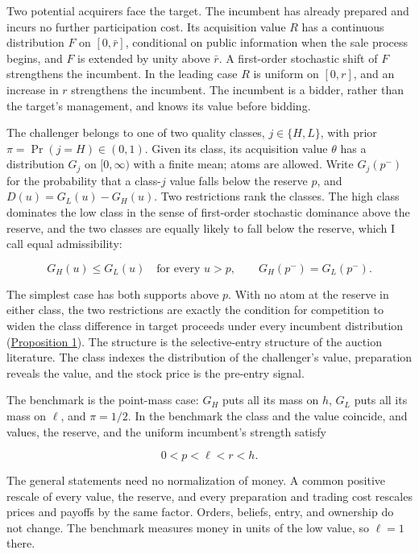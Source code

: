 Two potential acquirers face the target. The incumbent has already
prepared and incurs no further participation cost. Its acquisition value
\(R\) has a continuous distribution \(F\) on \([0,\bar r]\), conditional
on public information when the sale process begins, and \(F\) is
extended by unity above \(\bar r\). A first-order stochastic shift of
\(F\) strengthens the incumbent. In the leading case \(R\) is uniform on
\([0,r]\), and an increase in \(r\) strengthens the incumbent. The
incumbent is a bidder, rather than the target's management, and knows
its value before bidding.

The challenger belongs to one of two quality classes, \(j\in\{H,L\}\),
with prior \(\pi=\Pr(j=H)\in(0,1)\). Given its class, its acquisition
value \(\theta\) has a distribution \(G_j\) on \([0,\infty)\) with a
finite mean; atoms are allowed. Write \(G_j(p^-)\) for the probability
that a class-\(j\) value falls below the reserve \(p\), and
\(D(u)=G_L(u)-G_H(u)\). Two restrictions rank the classes. The high
class dominates the low class in the sense of first-order stochastic
dominance above the reserve, and the two classes are equally likely to
fall below the reserve, which I call equal admissibility:

\[
G_H(u)\le G_L(u)\quad\text{for every }u>p,\qquad
G_H(p^-)=G_L(p^-).
\]

The simplest case has both supports above \(p\). With no atom at the
reserve in either class, the two restrictions are exactly the condition
for competition to widen the class difference in target proceeds under
every incumbent distribution
(\hyperref[result-proposition-1]{Proposition 1}). The structure is the
selective-entry structure of the auction literature. The class indexes
the distribution of the challenger's value, preparation reveals the
value, and the stock price is the pre-entry signal.

The benchmark is the point-mass case: \(G_H\) puts all its mass on
\(h\), \(G_L\) puts all its mass on \(\ell\), and \(\pi=1/2\). In the
benchmark the class and the value coincide, and values, the reserve, and
the uniform incumbent's strength satisfy

\[
0<p<\ell<r<h.
\tag{1}\label{eq:paper-1}
\]

The general statements need no normalization of money. A common
positive rescale of every value, the reserve, and every preparation
and trading cost rescales prices and payoffs by the same factor.
Orders, beliefs, entry, and ownership do not change. The benchmark
measures money in units of the low value, so \(\ell=1\) there.

